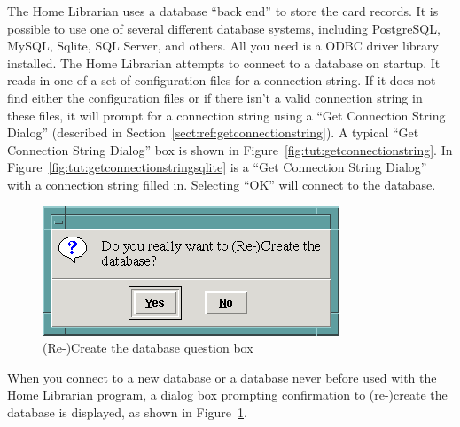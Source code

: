The Home Librarian uses a database ``back end'' to store the card
records. It is possible to use one of several different database
systems, including PostgreSQL, MySQL, Sqlite, SQL Server, and others.
All you need is a ODBC driver library installed. The Home Librarian
attempts to connect to a database on startup.  It reads in one of a set
of configuration files for a connection string.  If it does not find
either the configuration files or if there isn't a valid connection
string in these files, it will prompt for a connection string using a
``Get Connection String Dialog'' (described in
Section~\ref{sect:ref:getconnectionstring}). A typical ``Get Connection
String Dialog'' box is shown in
Figure~\ref{fig:tut:getconnectionstring}. In
Figure~\ref{fig:tut:getconnectionstringsqlite} is a ``Get Connection
String Dialog'' with a connection string filled in.  Selecting ``OK''
will connect to the database.

\begin{figure}[hpt]
\begin{centering}
\includegraphics{ReCreateDB.png}
\caption{(Re-)Create the database question box}
\label{fig:tut:recreatedatabase}
\end{centering}
\end{figure}
When you connect to a new database or a database never before used with
the Home Librarian program, a dialog box prompting confirmation to
(re-)create the database is displayed, as shown in
Figure~\ref{fig:tut:recreatedatabase}. 

